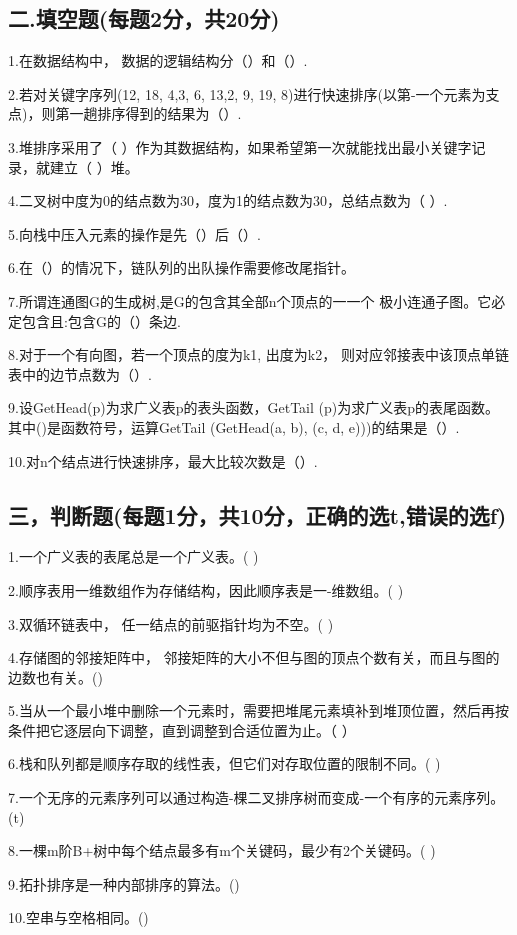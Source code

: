 \subsection{二.填空题(每题2分，共20分)}
1.在数据结构中， 数据的逻辑结构分（）和（）.

2.若对关键字序列(12, 18, 4,3, 6, 13,2, 9, 19, 8)进行快速排序(以第-一个元素为支点)，则第一趟排序得到的结果为（）.

3.堆排序采用了（ ）作为其数据结构，如果希望第一次就能找出最小关键字记录，就建立（ ）堆。

4.二叉树中度为0的结点数为30，度为1的结点数为30，总结点数为（  ）.

5.向栈中压入元素的操作是先（）后（）.

6.在（）的情况下，链队列的出队操作需要修改尾指针。

7.所谓连通图G的生成树,是G的包含其全部n个顶点的一一个 极小连通子图。它必定包含且:包含G的（）条边.

8.对于一个有向图，若一个顶点的度为k1, 出度为k2， 则对应邻接表中该顶点单链表中的边节点数为（）.

9.设GetHead(p)为求广义表p的表头函数，GetTail (p)为求广义表p的表尾函数。其中()是函数符号，运算GetTail (GetHead(a, b), (c, d, e)))的结果是（）.

10.对n个结点进行快速排序，最大比较次数是（）.

\subsection{三，判断题(每题1分，共10分，正确的选t,错误的选f)}
1.一个广义表的表尾总是一个广义表。( )

2.顺序表用一维数组作为存储结构，因此顺序表是一-维数组。( )

3.双循环链表中， 任一结点的前驱指针均为不空。( )

4.存储图的邻接矩阵中， 邻接矩阵的大小不但与图的顶点个数有关，而且与图的边数也有关。()

5.当从一个最小堆中删除一个元素时，需要把堆尾元素填补到堆顶位置，然后再按条件把它逐层向下调整，直到调整到合适位置为止。（  ）

6.栈和队列都是顺序存取的线性表，但它们对存取位置的限制不同。( )

7.一个无序的元素序列可以通过构造-棵二叉排序树而变成-一个有序的元素序列。(t)

8.一棵m阶B+树中每个结点最多有m个关键码，最少有2个关键码。( )

9.拓扑排序是一种内部排序的算法。()

10.空串与空格相同。()

